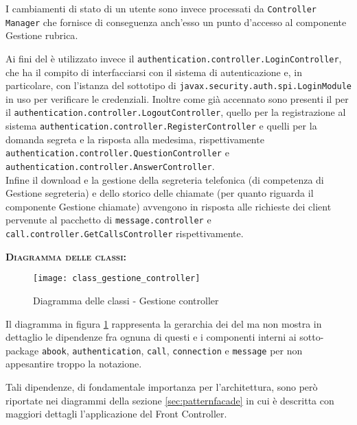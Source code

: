 \begin{description}
I cambiamenti di stato di un utente sono invece processati da \texttt{Controller Manager} che fornisce di conseguenza anch'esso un punto d'accesso al componente \textsf{Gestione rubrica}.

Ai fini del  è utilizzato invece il  \texttt{authentication.controller.LoginController}, che ha il compito di interfacciarsi con il sistema di autenticazione e, in particolare, con l'istanza del sottotipo di \texttt{javax.security.auth.spi.LoginModule} in uso per verificare le credenziali. Inoltre come già accennato sono presenti il  per il  \texttt{authentication.controller.LogoutController}, quello per la registrazione al sistema \texttt{authentication.controller.RegisterController} e quelli per la domanda segreta e la risposta alla medesima, rispettivamente \texttt{authentication.controller.QuestionController} e \texttt{authentication.controller.AnswerController}.\\

Infine il download e la gestione della segreteria telefonica (di competenza di \textsf{Gestione segreteria}) e dello storico delle chiamate (per quanto riguarda il componente \textsf{Gestione chiamate}) avvengono in risposta alle richieste dei client pervenute al pacchetto di  \texttt{message.controller} e \texttt{call.controller.GetCallsController} rispettivamente. 

	\item{\scshape\bfseries Diagramma delle classi:}
\begin{figure}[H]
  \centering
  \texttt{[image: class\_gestione\_controller]}
  \caption{Diagramma delle classi - Gestione controller}\label{fig:facadeserver}
\end{figure}

Il diagramma in figura \ref{fig:facadeserver} rappresenta la gerarchia dei  del  ma non mostra in dettaglio le dipendenze fra ognuna di questi e i componenti interni ai sotto-package \texttt{abook}, \texttt{authentication}, \texttt{call}, \texttt{connection} e \texttt{message} per non appesantire troppo la notazione.

Tali dipendenze, di fondamentale importanza per l'architettura, sono però riportate nei diagrammi della sezione \vref{sec:patternfacade} in cui è descritta con maggiori dettagli l'applicazione del  Front Controller.
	

\end{description}

